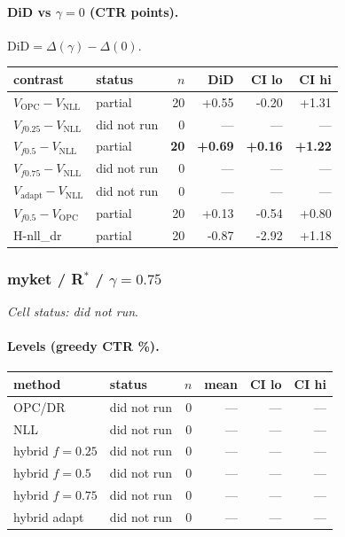 \documentclass[10pt,a4paper]{article}
\begin{document}
\paragraph{DiD vs $\gamma=0$ (CTR points).} $\mathrm{DiD}=\Delta(\gamma)-\Delta(0)$.
{\centering\small\begin{tabular}{llrrrr}
\toprule contrast & status & $n$ & DiD & CI lo & CI hi \\
\midrule
$V_{\mathrm{OPC}}-V_{\mathrm{NLL}}$ & partial & 20 & +0.55 & -0.20 & +1.31 \\
$V_{f0.25}-V_{\mathrm{NLL}}$ & did not run & 0 & --- & --- & --- \\
\textbf{$V_{f0.5}-V_{\mathrm{NLL}}$} & partial & \textbf{20} & \textbf{+0.69} & \textbf{+0.16} & \textbf{+1.22} \\
$V_{f0.75}-V_{\mathrm{NLL}}$ & did not run & 0 & --- & --- & --- \\
$V_{\mathrm{adapt}}-V_{\mathrm{NLL}}$ & did not run & 0 & --- & --- & --- \\
$V_{f0.5}-V_{\mathrm{OPC}}$ & partial & 20 & +0.13 & -0.54 & +0.80 \\
H-nll\_dr & partial & 20 & -0.87 & -2.92 & +1.18 \\
\bottomrule\end{tabular}\par}
\bigskip
\subsubsection{myket / R$^*$ / $\gamma=0.75$}
\emph{Cell status: did not run}.
\paragraph{Levels (greedy CTR \%).}
{\centering\small\begin{tabular}{llrrrr}
\toprule method & status & $n$ & mean & CI lo & CI hi \\
\midrule
OPC/DR & did not run & 0 & --- & --- & --- \\
NLL & did not run & 0 & --- & --- & --- \\
hybrid $f{=}0.25$ & did not run & 0 & --- & --- & --- \\
hybrid $f{=}0.5$ & did not run & 0 & --- & --- & --- \\
hybrid $f{=}0.75$ & did not run & 0 & --- & --- & --- \\
hybrid adapt & did not run & 0 & --- & --- & --- \\
\bottomrule\end{tabular}\par}
\end{document}
